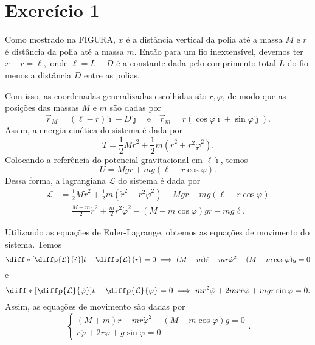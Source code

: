 \section*{Exercício 1}
Como mostrado na FIGURA, \(x\) é a distância vertical da polia até a massa \(M\) e \(r\) é distância da polia até a massa \(m\). Então para um fio inextensível, devemos ter \(x + r = \ell,\) onde \(\ell = L - D\) é a constante dada pelo comprimento total \(L\) do fio menos a distância \(D\) entre as polias.

Com isso, as coordenadas generalizadas escolhidas são \(r, \varphi\), de modo que as posições das massas \(M\) e \(m\) são dadas por
\begin{equation*}
    \vec{r}_M = (\ell - r)\hat{\imath}-D \hat{\jmath}\quad\text{e}\quad\vec{r}_m = r\left(\cos\varphi \hat{\imath} + \sin\varphi \hat{\jmath}\right).
\end{equation*}
Assim, a energia cinética do sistema é dada por
\begin{equation*}
    T = \frac12 M\dot{r}^2 + \frac12m \left(\dot{r}^2 + r^2\dot\varphi^2\right).
\end{equation*}
Colocando a referência do potencial gravitacional em \(\ell \hat{\imath}\), temos
\begin{equation*}
    U = Mgr + mg\left(\ell - r\cos\varphi\right).
\end{equation*}
Dessa forma, a lagrangiana \(\mathcal{L}\) do sistema é dada por
\begin{align*}
    \mathcal{L} &= \frac12 M\dot{r}^2 + \frac12m \left(\dot{r}^2 + r^2\dot\varphi^2\right) - Mgr - mg\left(\ell - r\cos\varphi\right)\\
                &= \frac{M+m}{2}\dot{r}^2 + \frac{m}{2}r^2\dot\varphi^2 - (M - m\cos\varphi)gr - mg\ell.
\end{align*}

Utilizando as equações de Euler-Lagrange, obtemos as equações de movimento do sistema. Temos
\begin{equation*}
    \diff*{{\left[\diffp{\mathcal{L}}{\dot{r}}\right]}}{t} - \diffp{\mathcal{L}}{r} = 0 \implies (M+m)\ddot{r} - mr\dot\varphi^2 - (M - m\cos\varphi)g = 0
\end{equation*}
e
\begin{equation*}
    \diff*{{\left[\diffp{\mathcal{L}}{\dot{\varphi}}\right]}}{t} - \diffp{\mathcal{L}}{\varphi} = 0 \implies mr^2\ddot\varphi + 2mr\dot{r}\dot\varphi + mgr\sin\varphi = 0.
\end{equation*}
Assim, as equações de movimento são dadas por
\begin{equation*}
    \begin{cases}
            (M+m)\ddot{r} - mr\dot\varphi^2 - (M - m\cos\varphi)g = 0\\
            r\ddot\varphi + 2\dot{r}\dot\varphi + g\sin\varphi = 0
    \end{cases}.
\end{equation*}
